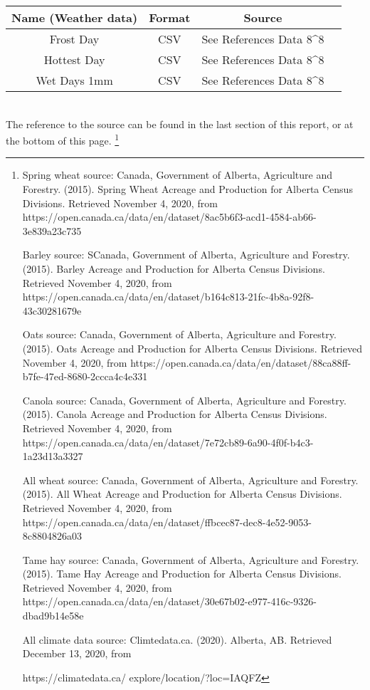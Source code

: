 \documentclass[fontsize=11pt]{article}
\begin{document}
\begin{tabular}{||c|c|c|c||}
    \hline
    Name (Weather data) & Format & Source\\
    \hline
    Frost Day & CSV & See References Data 8^8\\
    Hottest Day & CSV & See References Data 8^8\\
    Wet Days 1mm & CSV & See References Data 8^8\\
    \hline
\end{tabular}
\\


The reference to the source can be found in the last section of this report, or at the bottom of this page. \footnote{\item Spring wheat source: Canada, Government of Alberta, Agriculture and Forestry. (2015). Spring Wheat Acreage and Production for Alberta Census Divisions. Retrieved November 4, 2020, from https://open.canada.ca/data/en/dataset/8ac5b6f3-acd1-4584-ab66-3e839a23c735
    \item Barley source: SCanada, Government of Alberta, Agriculture and Forestry. (2015). Barley  Acreage and Production for Alberta Census Divisions. Retrieved November 4, 2020, from https://open.canada.ca/data/en/dataset/b164c813-21fc-4b8a-92f8-43c30281679e
    \item Oats source: Canada, Government of Alberta, Agriculture and Forestry. (2015). Oats  Acreage and Production for Alberta Census Divisions. Retrieved November 4, 2020, from https://open.canada.ca/data/en/dataset/88ca88ff-b7fe-47ed-8680-2ccca4c4e331
    \item Canola source: Canada, Government of Alberta, Agriculture and Forestry. (2015). Canola  Acreage and Production for Alberta Census Divisions. Retrieved November 4, 2020, from https://open.canada.ca/data/en/dataset/7e72cb89-6a90-4f0f-b4c3-1a23d13a3327
    \item All wheat source: Canada, Government of Alberta, Agriculture and Forestry. (2015). All Wheat  Acreage and Production for Alberta Census Divisions. Retrieved November 4, 2020, from https://open.canada.ca/data/en/dataset/ffbcec87-dec8-4e52-9053-8c8804826a03
    \item Tame hay source: Canada, Government of Alberta, Agriculture and Forestry. (2015). Tame Hay  Acreage and Production for Alberta Census Divisions. Retrieved November 4, 2020, from https://open.canada.ca/data/en/dataset/30e67b02-e977-416c-9326-dbad9b14e58e
    \item All climate data source: Climtedata.ca. (2020). Alberta, AB. Retrieved December 13, 2020, from 
    
    https://climatedata.ca/ explore/location/?loc=IAQFZ}\\
\end{document}
